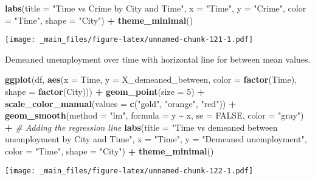 \documentclass[
]{book}
\newenvironment{Shaded}{\begin{snugshade}}{\end{snugshade}}
\newcommand{\AttributeTok}[1]{\textcolor[rgb]{0.13,0.29,0.53}{#1}}
\newcommand{\CommentTok}[1]{\textcolor[rgb]{0.56,0.35,0.01}{\textit{#1}}}
\newcommand{\ConstantTok}[1]{\textcolor[rgb]{0.56,0.35,0.01}{#1}}
\newcommand{\DecValTok}[1]{\textcolor[rgb]{0.00,0.00,0.81}{#1}}
\newcommand{\FunctionTok}[1]{\textcolor[rgb]{0.13,0.29,0.53}{\textbf{#1}}}
\newcommand{\NormalTok}[1]{#1}
\newcommand{\SpecialCharTok}[1]{\textcolor[rgb]{0.81,0.36,0.00}{\textbf{#1}}}
\newcommand{\StringTok}[1]{\textcolor[rgb]{0.31,0.60,0.02}{#1}}
\begin{document}
\begin{Shaded}
\begin{Highlighting}[]
  \FunctionTok{labs}\NormalTok{(}\AttributeTok{title =} \StringTok{"Time vs Crime by City and Time"}\NormalTok{,}
       \AttributeTok{x =} \StringTok{"Time"}\NormalTok{,}
       \AttributeTok{y =} \StringTok{"Crime"}\NormalTok{,}
       \AttributeTok{color =} \StringTok{"Time"}\NormalTok{,}
       \AttributeTok{shape =} \StringTok{"City"}\NormalTok{) }\SpecialCharTok{+}
  \FunctionTok{theme\_minimal}\NormalTok{()}
\end{Highlighting}
\end{Shaded}

\texttt{[image: \_main\_files/figure-latex/unnamed-chunk-121-1.pdf]}

Demeaned unemployment over time with horizontal line for between mean values.

\begin{Shaded}
\begin{Highlighting}[]
\FunctionTok{ggplot}\NormalTok{(df, }\FunctionTok{aes}\NormalTok{(}\AttributeTok{x =}\NormalTok{ Time, }\AttributeTok{y =}\NormalTok{ X\_demeaned\_between, }\AttributeTok{color =} \FunctionTok{factor}\NormalTok{(Time), }\AttributeTok{shape =} \FunctionTok{factor}\NormalTok{(City))) }\SpecialCharTok{+}
  \FunctionTok{geom\_point}\NormalTok{(}\AttributeTok{size =} \DecValTok{5}\NormalTok{) }\SpecialCharTok{+}
  \FunctionTok{scale\_color\_manual}\NormalTok{(}\AttributeTok{values =} \FunctionTok{c}\NormalTok{(}\StringTok{"gold"}\NormalTok{, }\StringTok{"orange"}\NormalTok{, }\StringTok{"red"}\NormalTok{)) }\SpecialCharTok{+}
  \FunctionTok{geom\_smooth}\NormalTok{(}\AttributeTok{method =} \StringTok{"lm"}\NormalTok{, }\AttributeTok{formula =}\NormalTok{ y }\SpecialCharTok{\textasciitilde{}}\NormalTok{ x, }\AttributeTok{se =} \ConstantTok{FALSE}\NormalTok{, }\AttributeTok{color =} \StringTok{"gray"}\NormalTok{) }\SpecialCharTok{+}  \CommentTok{\# Adding the regression line}
  \FunctionTok{labs}\NormalTok{(}\AttributeTok{title =} \StringTok{"Time vs demeaned between unemployment by City and Time"}\NormalTok{,}
       \AttributeTok{x =} \StringTok{"Time"}\NormalTok{,}
       \AttributeTok{y =} \StringTok{"Demeaned unemployment"}\NormalTok{,}
       \AttributeTok{color =} \StringTok{"Time"}\NormalTok{,}
       \AttributeTok{shape =} \StringTok{"City"}\NormalTok{) }\SpecialCharTok{+}
  \FunctionTok{theme\_minimal}\NormalTok{()}
\end{Highlighting}
\end{Shaded}

\texttt{[image: \_main\_files/figure-latex/unnamed-chunk-122-1.pdf]}
\end{document}

